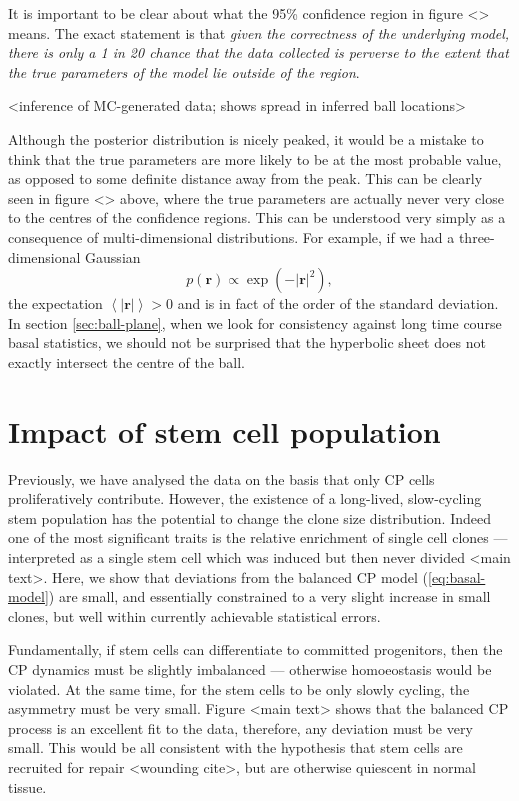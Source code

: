 \documentclass[10pt,UKenglish]{article}
\begin{document}
It is important to be clear about what the 95\% confidence region in figure <> means. The exact statement is that \emph{given the correctness of the underlying model, there is only a 1 in 20 chance that the data collected is perverse to the extent that the true parameters of the model lie outside of the region}.

<inference of MC-generated data; shows spread in inferred ball locations>

Although the posterior distribution is nicely peaked, it would be a mistake to think that the true parameters are more likely to be at the most probable value, as opposed to some definite distance away from the peak. This can be clearly seen in figure <> above, where the true parameters are actually never very close to the centres of the confidence regions. This can be understood very simply as a consequence of multi-dimensional distributions. For example, if we had a three-dimensional Gaussian $$p(\mathbf{r}) \propto \exp\left(-|\mathbf r|^2\right),$$ the expectation $\left\langle \mathbf |\mathbf r| \right\rangle > 0$ and is in fact of the order of the standard deviation. In section \ref{sec:ball-plane}, when we look for consistency against long time course basal statistics, we should not be surprised that the hyperbolic sheet does not exactly intersect the centre of the ball.

\section{\label{sec:stem}Impact of stem cell population}

Previously, we have analysed the data on the basis that only CP cells proliferatively contribute. However, the existence of a long-lived, slow-cycling stem population has the potential to change the clone size distribution. Indeed one of the most significant traits is the relative enrichment of single cell clones --- interpreted as a single stem cell which was induced but then never divided <main text>. Here, we show that deviations from the balanced CP model (\ref{eq:basal-model}) are small, and essentially constrained to a very slight increase in small clones, but well within currently achievable statistical errors.

Fundamentally, if stem cells can differentiate to committed progenitors, then the CP dynamics must be slightly imbalanced --- otherwise homoeostasis would be violated. At the same time, for the stem cells to be only slowly cycling, the asymmetry must be very small. Figure <main text> shows that the balanced CP process is an excellent fit to the data, therefore, any deviation must be very small. This would be all consistent with the hypothesis that stem cells are recruited for repair <wounding cite>, but are otherwise quiescent in normal tissue.
\end{document}
